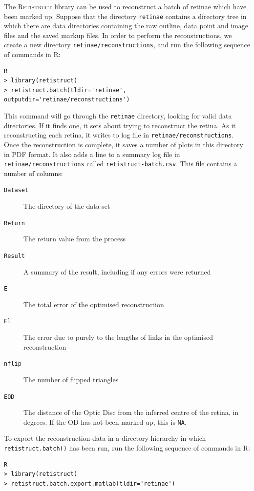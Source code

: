 \documentclass{book}
\begin{document}
The \textsc{Retistruct} library can be used to reconstruct a batch of
retinae which have been marked up. Suppose that the directory
\texttt{retinae} contains a directory tree in which there are data
directories containing the raw outline, data point and image files and
the saved markup files. In order to perform the reconstructions, we
create a new directory \texttt{retinae/reconstructions}, and run the
following sequence of commands in R:
\begin{verbatim}
R
> library(retistruct)
> retistruct.batch(tldir='retinae', outputdir='retinae/reconstructions')
\end{verbatim}
This command will go through the \texttt{retinae} directory, looking
for valid data directories. If it finds one, it sets about trying to
reconstruct the retina. As it reconstructing each retina, it writes to
log file in \texttt{retinae/reconstructions}. Once the reconstruction
is complete, it saves a number of plots in this directory in PDF
format. It also adds a line to a summary log file in
\texttt{retinae/reconstructions} called
\texttt{retistruct-batch.csv}. This file contains a number of columns:
\begin{description}
\item[\texttt{Dataset}] The directory of the data set
\item[\texttt{Return}] The return value from the process
\item[\texttt{Result}] A summary of the result, including if any
  errors were returned
\item[\texttt{E}] The total error  of the optimised reconstruction
\item[\texttt{El}] The error due to purely to the lengths of links in
  the optimised reconstruction
\item[\texttt{nflip}] The number of flipped triangles
\item[\texttt{EOD}] The distance of the Optic Disc from the inferred
  centre of the retina, in degrees. If the OD has not been marked up,
  this is \texttt{NA}.
\end{description}

To export the reconstruction data in a directory hierarchy in which
\texttt{retistruct.batch()} has been run, run the following sequence
of commands in R:
\begin{verbatim}
R
> library(retistruct)
> retistruct.batch.export.matlab(tldir='retinae')
\end{verbatim}


\appendix
\end{document}
